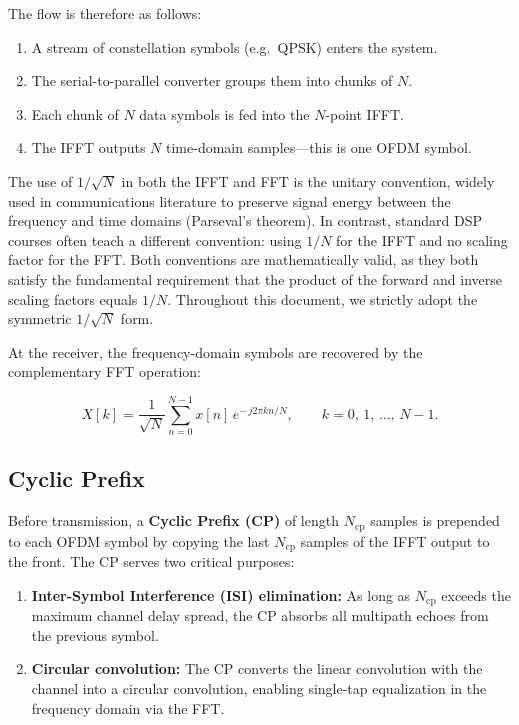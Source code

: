 The flow is therefore as follows:
\begin{enumerate}
    \item A stream of constellation symbols (e.g.\ QPSK) enters the system.
    \item The serial-to-parallel converter groups them into chunks of $N$.
    \item Each chunk of $N$ data symbols is fed into the $N$-point IFFT.
    \item The IFFT outputs $N$ time-domain samples---this is one OFDM symbol.
\end{enumerate}

\begin{keyinsight}
    The use of $1/\!\sqrt{N}$ in both the IFFT and FFT is the unitary convention, widely used in communications literature to preserve signal energy between the frequency and time domains (Parseval's theorem). In contrast, standard DSP courses often teach a different convention: using $1/N$ for the IFFT and no scaling factor for the FFT. Both conventions are mathematically valid, as they both satisfy the fundamental requirement that the product of the forward and inverse scaling factors equals $1/N$. Throughout this document, we strictly adopt the symmetric $1/\!\sqrt{N}$ form.
\end{keyinsight}

At the receiver, the frequency-domain symbols are recovered by the complementary
FFT operation:
\begin{keyresult}
\begin{equation}
    X[k] = \frac{1}{\sqrt{N}} \sum_{n=0}^{N-1} x[n] \, e^{-\,j2\pi kn/N},
    \qquad k = 0,\, 1,\, \dots,\, N-1.
\end{equation}
\end{keyresult}

\subsection{Cyclic Prefix}

Before transmission, a \textbf{Cyclic Prefix (CP)} of length $N_{\mathrm{cp}}$ samples is prepended to each OFDM symbol by copying the last $N_{\mathrm{cp}}$ samples of the IFFT output to the front.  The CP serves two critical purposes:
\begin{enumerate}
    \item \textbf{Inter-Symbol Interference (ISI) elimination:} As long as $N_{\mathrm{cp}}$ exceeds the maximum channel delay spread, the CP absorbs all multipath echoes from the previous symbol.
    \item \textbf{Circular convolution:} The CP converts the linear convolution with the channel into a circular convolution, enabling single-tap equalization in the frequency domain via the FFT.
\end{enumerate}

